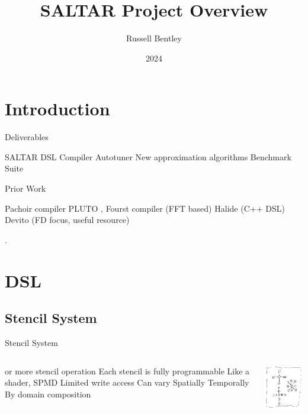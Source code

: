 \documentclass{beamer}
\title{SALTAR Project Overview}
\author{Russell Bentley}
\institute{Stony Brook}
\date{2024}
\begin{document}
\frame{\titlepage}

\section{Introduction}

\begin{frame}{Deliverables}
\begin{outline}
  \1 SALTAR
    \2 DSL 
    \2 Compiler
    \2 Autotuner
  \1 New approximation algorithms
  \1 Benchmark Suite
\end{outline}
\end{frame}

\begin{frame}{Prior Work}
\begin{outline}
  \1 Pachoir compiler \cite{Tang2011}
  \1 PLUTO \cite{Bondhugula2008}, \cite{Bondhugula2008Pract}
  \1 Fourst compiler (FFT based) \cite{Ahmad2022}
  \1 Halide (C++ DSL) \cite{Ragan2013}
  \1 Devito (FD focus, useful resource) \cite{Luporini2020}
\end{outline}.
\end{frame}

\section{DSL}

\subsection{Stencil System}
\begin{frame}{Stencil System}
\begin{columns}
\centering
\begin{outline}
   or more stencil operation
  \1 Each stencil is fully programmable
    \2 Like a shader, SPMD
    \2 Limited write access
  \1 Can vary
    \2 Spatially
    \2 Temporally
    \2 By domain composition
\end{outline}
\centering
\includegraphics[width=4cm]{stencil_system_drawn.png}
\end{columns}
\end{frame}
\end{document}
